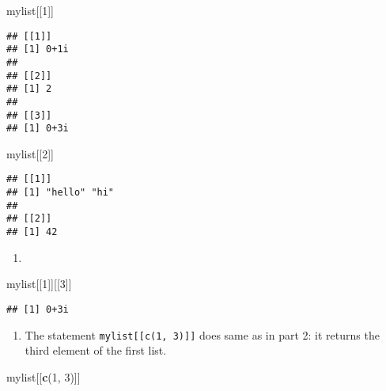 \documentclass[
]{article}
\newenvironment{Shaded}{\begin{snugshade}}{\end{snugshade}}
\newcommand{\DecValTok}[1]{\textcolor[rgb]{0.00,0.00,0.81}{#1}}
\newcommand{\KeywordTok}[1]{\textcolor[rgb]{0.13,0.29,0.53}{\textbf{#1}}}
\newcommand{\NormalTok}[1]{#1}
\providecommand{\tightlist}{%
  \setlength{\itemsep}{0pt}\setlength{\parskip}{0pt}}
\begin{document}
\begin{Shaded}
\begin{Highlighting}[]
\NormalTok{mylist[[}\DecValTok{1}\NormalTok{]]}
\end{Highlighting}
\end{Shaded}

\begin{verbatim}
## [[1]]
## [1] 0+1i
## 
## [[2]]
## [1] 2
## 
## [[3]]
## [1] 0+3i
\end{verbatim}

\begin{Shaded}
\begin{Highlighting}[]
\NormalTok{mylist[[}\DecValTok{2}\NormalTok{]]}
\end{Highlighting}
\end{Shaded}

\begin{verbatim}
## [[1]]
## [1] "hello" "hi"   
## 
## [[2]]
## [1] 42
\end{verbatim}

\begin{enumerate}
\def\labelenumi{\arabic{enumi}.}
\setcounter{enumi}{1}
\tightlist
\item
\end{enumerate}

\begin{Shaded}
\begin{Highlighting}[]
\NormalTok{mylist[[}\DecValTok{1}\NormalTok{]][[}\DecValTok{3}\NormalTok{]]}
\end{Highlighting}
\end{Shaded}

\begin{verbatim}
## [1] 0+3i
\end{verbatim}

\begin{enumerate}
\def\labelenumi{\arabic{enumi}.}
\setcounter{enumi}{2}
\tightlist
\item
  The statement \texttt{mylist{[}{[}c(1,\ 3){]}{]}} does same as in part
  2: it returns the third element of the first list.
\end{enumerate}

\begin{Shaded}
\begin{Highlighting}[]
\NormalTok{mylist[[}\KeywordTok{c}\NormalTok{(}\DecValTok{1}\NormalTok{, }\DecValTok{3}\NormalTok{)]]}
\end{Highlighting}
\end{Shaded}
\end{document}

